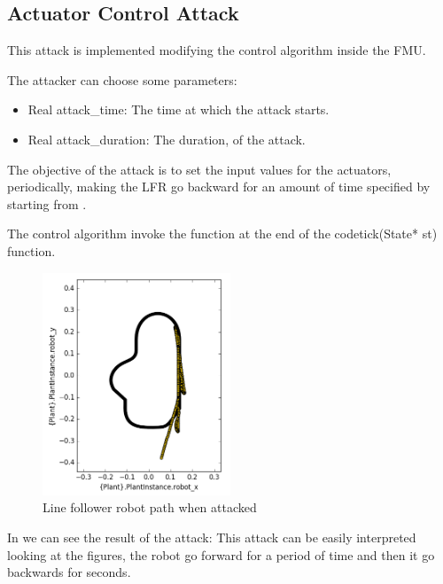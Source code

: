 \subsection{Actuator Control Attack}

This attack is implemented modifying the control algorithm inside the
 FMU\@.

The attacker can choose some parameters:
\begin{itemize}
\item Real attack\_time: The time at which the attack starts.
\item Real attack\_duration: The duration, of the attack.
\end{itemize}

The objective of the attack is to set the input values for the actuators,
periodically, making the LFR go backward for an amount of time specified by
 starting from .

The control algorithm invoke the  function at
the end of the code{tick(State* st)} function. 



\begin{figure}[htb]
	\centering
	\includegraphics[width=0.5\textwidth]{img/actuator_attack_control.png}
	\caption{Line follower robot path when
	attacked}\label{fig:actuatorcontrolresult}
\end{figure}

In  we can see the result of the attack: This
attack can be easily interpreted looking at the figures, the robot go forward
for a period of time and then it go backwards for 
seconds.

